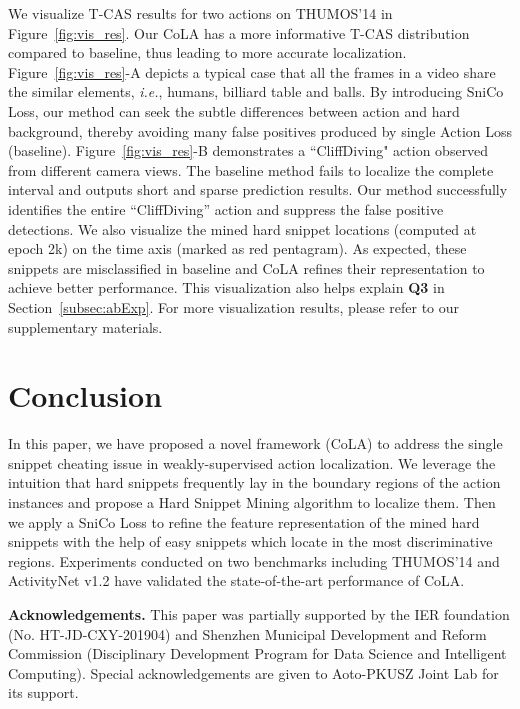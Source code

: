 \documentclass[final]{cvpr}
\begin{document}
\begin{table*}[t]
We visualize T-CAS results for two actions on THUMOS'14 in Figure~\ref{fig:vis_res}. Our CoLA has a more informative T-CAS distribution compared to baseline, thus leading to more accurate localization. Figure~\ref{fig:vis_res}-A depicts a typical case that all the frames in a video share the similar elements, \emph{i.e.}, humans, billiard table and balls. By introducing SniCo Loss, our method can seek the subtle differences between action and hard background, thereby avoiding many false positives produced by single Action Loss (baseline). Figure~\ref{fig:vis_res}-B demonstrates a ``CliffDiving" action observed from different camera views. The baseline method fails to localize the complete interval and outputs short and sparse prediction results. Our method successfully identifies the entire ``CliffDiving'' action and suppress the false positive detections. We also visualize the mined hard snippet locations (computed at epoch 2k) on the time axis (marked as red pentagram). As expected, these snippets are misclassified in baseline and CoLA refines their representation to achieve better performance. This visualization also helps explain \textbf{Q3} in Section~\ref{subsec:abExp}. For more visualization results, please refer to our supplementary materials.
 \section{Conclusion}
In this paper, we have proposed a novel framework (CoLA) to address the single snippet cheating issue in weakly-supervised action localization. We leverage the intuition that hard snippets frequently lay in the boundary regions of the action instances and propose a Hard Snippet Mining algorithm to localize them. Then we apply a SniCo Loss to refine the feature representation of the mined hard snippets with the help of easy snippets which locate in the most discriminative regions. Experiments conducted on two benchmarks including THUMOS'14 and ActivityNet v1.2 have validated the state-of-the-art performance of CoLA.  \vspace{10pt}

{\footnotesize \noindent \textbf{Acknowledgements.} This paper was partially supported by the IER foundation (No. HT-JD-CXY-201904) and Shenzhen Municipal Development and Reform Commission (Disciplinary Development Program for Data Science and Intelligent Computing). Special acknowledgements are given to Aoto-PKUSZ Joint Lab for its support.}


{\small


}
\end{table*}
\end{document}
